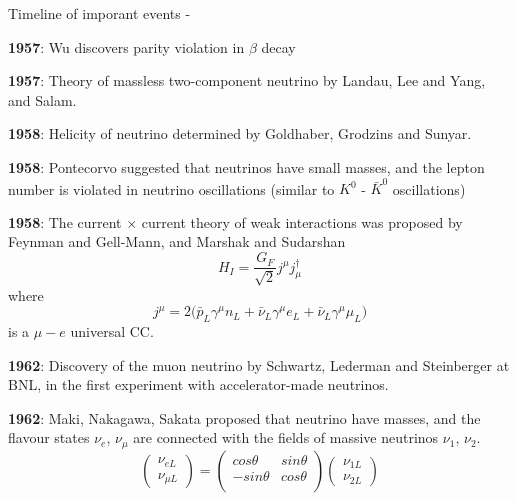 \begin{frame}[t,allowframebreaks]{Timeline of imporant events - }
\begin{itemize}
{ \framebreak

 \item {\bf 1957}: Wu discovers parity violation in $\beta$ decay

 \item {\bf 1957}: Theory of massless two-component neutrino by Landau, Lee and Yang, and Salam.

 \item {\bf 1958}: Helicity of neutrino determined by Goldhaber, Grodzins and Sunyar.

 \item {\bf 1958}: Pontecorvo suggested that neutrinos have small masses,
  and the lepton number is violated in neutrino oscillations (similar to $K^0$ - $\bar{K}^0$ oscillations)

 \item {\bf 1958}: The current $\times$ current theory of weak interactions was
  proposed by Feynman and Gell-Mann, and Marshak and Sudarshan
  \begin{equation*}
    H_I = \frac{G_F}{\sqrt{2}} j^{\mu}  j_{\mu}^{\dagger}
  \end{equation*}
  where
  \begin{equation*}
    j^{\mu} = 2 \Big(\bar{p}_{L} \gamma^{\mu} n_{L} +
                     \bar{\nu}_{L} \gamma^{\mu} e_{L} +
                     \bar{\nu}_{L} \gamma^{\mu} \mu_{L} \Big)
  \end{equation*}
  is a $\mu-e$ universal CC.

  \item {\bf 1962}: Discovery of the muon neutrino by Schwartz, Lederman and Steinberger at BNL,
  in the first experiment with accelerator-made neutrinos.

  \item {\bf 1962}: Maki, Nakagawa, Sakata proposed that neutrino have masses,
  and the flavour states $\nu_e$, $\nu_{\mu}$ are connected with the fields of
  massive neutrinos $\nu_1$, $\nu_2$.
  \begin{equation}
   \nonumber
   \begin{pmatrix}
    \nu_{e L}\\ \nu_{\mu L}
   \end{pmatrix}
   =
   \begin{pmatrix}
     cos\theta & sin\theta \\
    -sin\theta & cos\theta \\
   \end{pmatrix}
   \begin{pmatrix}
    \nu_{1 L}\\ \nu_{2 L}
   \end{pmatrix}
  \end{equation}

}
\end{itemize}
\end{frame}
